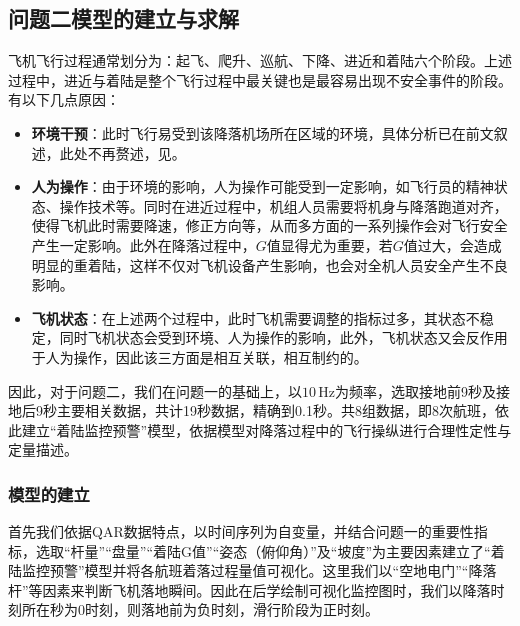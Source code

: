 \documentclass{MathorCupModeling}
\begin{document}
	\subsection{问题二模型的建立与求解}
	飞机飞行过程通常划分为：起飞、爬升、巡航、下降、进近和着陆六个阶段\textcolor{blue}{\cite{Paper:郑薇}}。上述过程中，进近与着陆是整个飞行过程中最关键也是最容易出现不安全事件的阶段。有以下几点原因：
	\begin{itemize}
		\item \textbf{环境干预}：此时飞行易受到该降落机场所在区域的环境，具体分析已在前文叙述，此处不再赘述，见\textcolor{blue}{}。
		\item \textbf{人为操作}：由于环境的影响，人为操作可能受到一定影响，如飞行员的精神状态、操作技术等。同时在进近过程中，机组人员需要将机身与降落跑道对齐，使得飞机此时需要降速，修正方向等，从而多方面的一系列操作会对飞行安全产生一定影响。此外在降落过程中，$G$值显得尤为重要，若$G$值过大，会造成明显的重着陆，这样不仅对飞机设备产生影响，也会对全机人员安全产生不良影响。
		\item \textbf{飞机状态}：在上述两个过程中，此时飞机需要调整的指标过多，其状态不稳定，同时飞机状态会受到环境、人为操作的影响，此外，飞机状态又会反作用于人为操作，因此该三方面是相互关联，相互制约的。
	\end{itemize}
	
	因此，对于问题二，我们在问题一的基础上，以$10\,\text{Hz}$为频率，选取接地前9秒及接地后9秒主要相关数据，共计19秒数据，精确到0.1秒。共8组数据，即8次航班，依此建立“着陆监控预警”模型，依据模型对降落过程中的飞行操纵进行合理性定性与定量描述。
	\subsubsection{模型的建立}
	首先我们依据QAR数据特点，以时间序列为自变量，并结合问题一的重要性指标，选取“杆量”“盘量”“着陆G值”“姿态（俯仰角）”及“坡度”为主要因素建立了“着陆监控预警”模型并将各航班着落过程量值可视化。这里我们以“空地电门”“降落杆”等因素来判断飞机落地瞬间。因此在后学绘制可视化监控图时，我们以降落时刻所在秒为$0$时刻，则落地前为负时刻，滑行阶段为正时刻。
\end{document}
